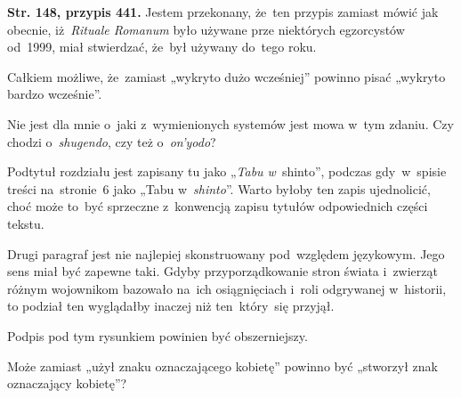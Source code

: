 \documentclass[a4paper,11pt]{article}
\begin{document}
\vspace{\spaceFour}



\start \textbf{Str. 148, przypis 441.} Jestem przekonany, że~ten przypis
zamiast mówić jak obecnie, iż~\textit{Rituale Romanum} było używane prze
niektórych egzorcystów od~1999, miał stwierdzać, że~był używany
do~tego roku.

\vspace{\spaceFour}



\start {} Całkiem możliwe, że~zamiast „wykryto dużo
wcześniej” powinno pisać „wykryto bardzo wcześnie”.

\vspace{\spaceFour}



\start {} Nie jest dla mnie o~jaki z~wymienionych systemów
jest mowa w~tym zdaniu. Czy chodzi o~\textit{shugendo}, %
czy też o~\textit{on'yodo}? %

\vspace{\spaceFour}



\start {} Podtytuł rozdziału jest zapisany tu jako „\textit{Tabu
  w}~shinto”, %
podczas gdy~w~spisie treści na~stronie~6 jako „Tabu
w~\textit{shinto}”. %
Warto byłoby ten zapis ujednolicić, choć może to~być sprzeczne
z~konwencją zapisu tytułów odpowiednich części tekstu.

\vspace{\spaceFour}



\start {} Drugi paragraf jest nie najlepiej skonstruowany
pod~względem językowym. Jego sens miał być zapewne taki. Gdyby
przyporządkowanie stron świata i~zwierząt różnym wojownikom bazowało
na~ich osiągnięciach i~roli odgrywanej w~historii, to podział ten
wyglądałby inaczej niż ten~który~się przyjął.

\vspace{\spaceFour}



\start {} Podpis pod tym rysunkiem powinien być obszerniejszy.

\vspace{\spaceFour}



\start {} Może zamiast „użył znaku oznaczającego
kobietę” powinno być „stworzył znak oznaczający kobietę”?
\end{document}
